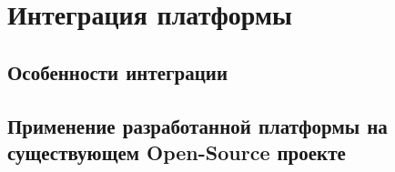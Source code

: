 \section{Интеграция платформы}

\subsection{Особенности интеграции}


\subsection{Применение разработанной платформы на существующем Open-Source проекте}


\pagebreak